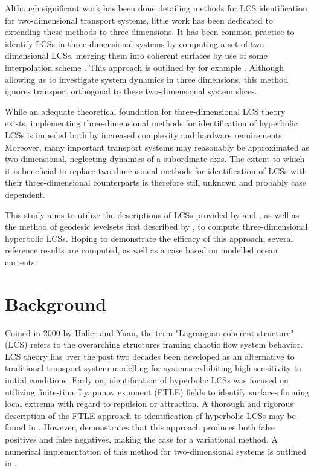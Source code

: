 Although significant work has been done detailing methods for LCS identification for two-dimensional transport systems, little work has been dedicated to extending these methods to three dimensions. It has been common practice to identify LCSs in three-dimensional systems by computing a set of two-dimensional LCSs, merging them into coherent surfaces by use of some interpolation scheme \citep{Oettinger}. This approach is outlined by for example \cite{Blazevski}. Although allowing us to investigate system dynamics in three dimensions, this method ignores transport orthogonal to these two-dimensional system slices.

While an adequate theoretical foundation for three-dimensional LCS theory exists, implementing three-dimensional methods for identification of hyperbolic LCSs is impeded both by increased complexity and hardware requirements. Moreover, many important transport systems may reasonably be approximated as two-dimensional, neglecting dynamics of a subordinate axis. The extent to which it is beneficial to replace two-dimensional methods for identification of LCSs with their three-dimensional counterparts is therefore still unknown and probably case dependent.

This study aims to utilize the descriptions of LCSs provided by \cite{Haller14} and \cite{Oettinger}, as well as the method of geodesic levelsets first described by \cite{GeodesicLevelSets}, to compute three-dimensional hyperbolic LCSs. Hoping to demonstrate the efficacy of this approach, several reference results are computed, as well as a case based on modelled ocean currents.

\section{Background}

Coined in 2000 by Haller and Yuan, the term  "Lagrangian coherent structure" (LCS) refers to the overarching structures framing chaotic flow system behavior. LCS theory has over the past two decades been developed as an alternative to traditional transport system modelling for systems exhibiting high sensitivity to initial conditions. Early on, identification of hyperbolic LCSs was focused on utilizing finite-time Lyapunov exponent (FTLE) fields to identify surfaces forming local extrema with regard to repulsion or attraction. A thorough and rigorous description of the FTLE approach to identification of hyperbolic LCSs may be found in \cite{Shadden05}.  However, \cite{Haller14} demonstrates that this approach produces both false positives and false negatives, making the case for a variational method. A numerical implementation of this method for two-dimensional systems is outlined in \cite{Haller12}.

